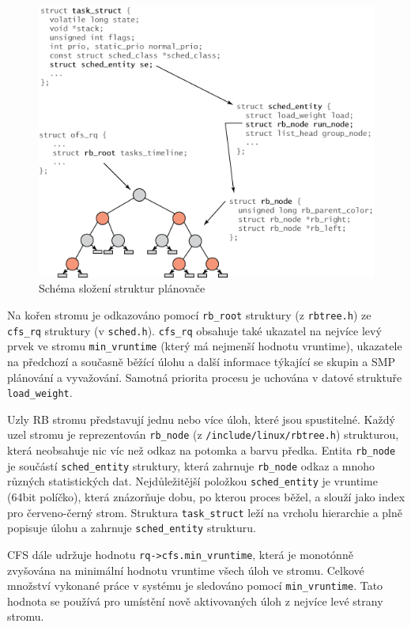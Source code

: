 \documentclass[
  master=true,
  font=sans,
  printversion=false,
  joinlists=true,
  figures=true,
  tables=true,
  sourcecodes=false,
  theorems=false,
  bibencoding=utf8,
  language=czech,
  encoding=utf8,
  field=ainfk,
  biblatex,
  glossaries,
  index
]{kidiplom}
\begin{document}
\begin{figure}[ht]
\includegraphics[scale=1]{obrazky/schedulerStructures.png}
\caption{Schéma složení struktur plánovače}
\label{scheduler structures}
\end{figure}


Na kořen stromu je odkazováno pomocí \verb#rb_root# struktury (z \verb#rbtree.h#) ze \verb#cfs_rq# struktury (v \verb#sched.h#).
\verb#cfs_rq# obsahuje také ukazatel na nejvíce levý prvek ve stromu \verb#min_vruntime# (který má nejmenší hodnotu vruntime), ukazatele na předchozí a současně běžící úlohu a další informace týkající se skupin a SMP plánování a vyvažování. Samotná priorita procesu je uchována v datové struktuře \verb#load_weight#. 

Uzly RB stromu představují jednu nebo více úloh, které jsou spustitelné. Každý uzel stromu je reprezentován \verb#rb_node# (z \verb#/include/linux/rbtree.h#) strukturou, která neobsahuje nic víc než odkaz na potomka a barvu předka. Entita \verb#rb_node# je součástí \verb#sched_entity# struktury, která zahrnuje \verb#rb_node# odkaz a mnoho různých statistických dat. Nejdůležitější položkou \verb#sched_entity# je vruntime (64bit políčko), která znázorňuje dobu, po kterou proces běžel, a slouží jako index pro červeno-černý strom. Struktura \verb#task_struct# leží na vrcholu hierarchie a plně popisuje úlohu a zahrnuje \verb#sched_entity# strukturu. 

CFS dále udržuje hodnotu \verb#rq->cfs.min_vruntime#, která je monotónně zvyšována na minimální hodnotu vruntime všech úloh ve stromu. Celkové množství vykonané práce v systému je sledováno pomocí \verb#min_vruntime#. Tato hodnota se používá pro umístění nově aktivovaných úloh z nejvíce levé strany stromu.
\end{document}
